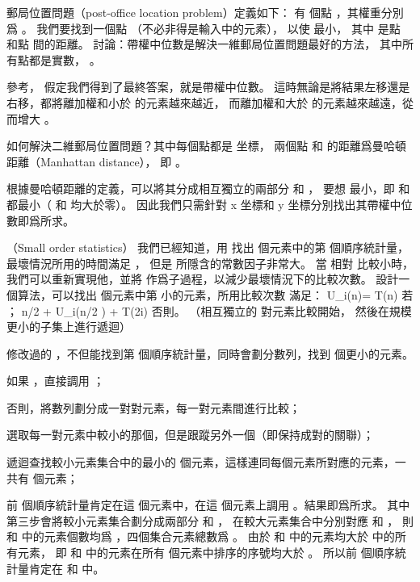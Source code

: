 郵局位置問題（post-office location problem）定義如下：
有  個點 ，其權重分別爲 。
我們要找到一個點  （不必非得是輸入中的元素），
以使  最小，
其中  是點  和點  間的距離。
\startigBase[a,continue]
\startitem
討論：帶權中位數是解決一維郵局位置問題最好的方法，
其中所有點都是實數， 。
\stopitem

\startANSWER
參考，
假定我們得到了最終答案，就是帶權中位數。
這時無論是將結果左移還是右移，都將離加權和小於  的元素越來越近，
而離加權和大於  的元素越來越遠，從而增大 。
\stopANSWER

\startitem
如何解決二維郵局位置問題？其中每個點都是  坐標，
兩個點  和  的距離爲{\EMP 曼哈頓距離（Manhattan distance）}，
即 。
\stopitem

\startANSWER
根據曼哈頓距離的定義，可以將其分成相互獨立的兩部分  和 ，
要想  最小，即  和  都最小（ 和  均大於零）。
因此我們只需針對 x 坐標和 y 坐標分別找出其帶權中位數即爲所求。
\stopANSWER
\stopigBase

\stopPROBLEM

\startPROBLEM
（Small order statistics）
我們已經知道，用  找出  個元素中的第  個順序統計量，
最壞情況所用的時間滿足 ，
但是 \m{\Theta} 所隱含的常數因子非常大。
當  相對  比較小時，
我們可以重新實現他，並將  作爲子過程，以減少最壞情況下的比較次數。
\startigBase[a]
\startitem
設計一個算法，可以找出  個元素中第  小的元素，所用比較次數  滿足：
\startformula
U_i(n)=\startmathcases
\NC T(n) \NC 若 ； \NR
\NC \left\lfloor n/2 \right\rfloor + U_i(\left\lceil n/2 \right\rceil) + T(2i) \NC 否則。 \NR
\stopmathcases
\stopformula
（\hint 相互獨立的 對元素比較開始，
然後在規模更小的子集上進行遞迴）
\stopitem

\startANSWER
修改過的 ，不但能找到第  個順序統計量，同時會劃分數列，找到  個更小的元素。
\startigNum
\item 如果 ，直接調用 ；
\item 否則，將數列劃分成一對對元素，每一對元素間進行比較；
\item 選取每一對元素中較小的那個，但是跟蹤另外一個（即保持成對的關聯）；
\item 遞迴查找較小元素集合中的最小的  個元素，這樣連同每個元素所對應的元素，一共有  個元素；
\item 前  個順序統計量肯定在這  個元素中，在這  個元素上調用 。結果即爲所求。
\stopigNum
其中第三步會將較小元素集合劃分成兩部分  和 ，
在較大元素集合中分別對應  和 ，
則  和  中的元素個數均爲 ，四個集合元素總數爲 。
由於  和  中的元素均大於  中的所有元素，
即  和  中的元素在所有  個元素中排序的序號均大於 。
所以前  個順序統計量肯定在  和  中。
\stopANSWER

